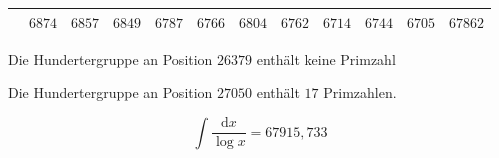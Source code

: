 \begin{minipage}{\linewidth}
\begin{tabular}{r|rrrrrrrrrr|r}
\hline
 & $6874$ & $6857$ & $6849$ & $6787$ & $6766$ & $6804$ & $6762$ & $6714$ & $6744$ & $6705$ & $67862$ \\ \hline
\end{tabular}\par\endgroup
\noindent Die Hundertergruppe an Position \(26379\) enthält keine Primzahl\par
\noindent Die Hundertergruppe an Position \(27050\) enthält \(17\) Primzahlen.\par
\setlength{\abovedisplayskip}{6pt}\setlength{\belowdisplayskip}{4pt}
\[\int\frac{\mathrm{d}x}{\log x}=67915{,}733\]
\end{minipage}\par
